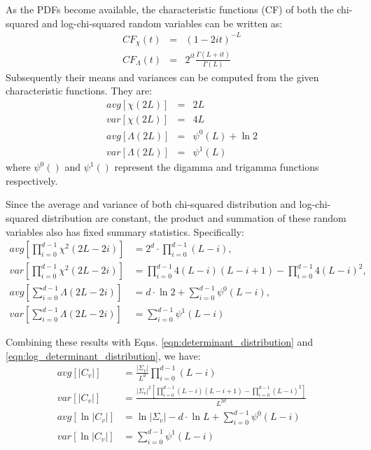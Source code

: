\documentclass[journal]{IEEEtran}
\begin{document}
As the PDFs become available, the characteristic functions (CF) of both the chi-squared and log-chi-squared random variables
  can be written as:
  \begin{eqnarray}
    CF_\chi(t) &=& (1-2it)^{−L} \\ 
    CF_\Lambda(t) &=& 2^{it} \frac{\Gamma(L+it)}{\Gamma(L)} \label{eqn:log_chi_squared_characteristic_function}
  \end{eqnarray}
Subsequently their means and variances can be computed from the given characteristic functions.
They are:
  \begin{eqnarray}
    avg \left[ \chi(2L) \right]&=&2L \\
var \left[ \chi(2L) \right]&=&4L \\
avg \left[ \Lambda(2L) \right] &=& \psi^0(L) + \ln2 \\
var \left[ \Lambda(2L) \right] &=& \psi^1(L)
  \end{eqnarray}
  where $\psi^0()$ and $\psi^1()$ represent the digamma and trigamma functions respectively.

Since the average and variance of both chi-squared distribution and log-chi-squared distribution are constant,
  the product and summation of these random variables also has fixed summary statistics.
Specifically:
\begin{align*}
  avg \left[ \prod^{d-1}_{i=0} \chi^2(2L-2i) \right] &= 2^d \cdot \prod^{d-1}_{i=0} (L-i), \\
  var \left[ \prod^{d-1}_{i=0} \chi^2(2L-2i) \right] &= \prod^{d-1}_{i=0} 4(L-i)(L-i+1) - \prod^{d-1}_{i=0} 4(L-i)^2, \\
  avg \left[ \sum^{d-1}_{i=0} \Lambda(2L-2i) \right] &= d \cdot \ln{2} + \sum^{d-1}_{i=0} \psi^0(L-i), \\
  var \left[ \sum^{d-1}_{i=0} \Lambda(2L-2i) \right] &= \sum^{d-1}_{i=0} \psi^1(L-i)
\end{align*}

Combining these results with Eqns. \ref{eqn:determinant_distribution} and \ref{eqn:log_determinant_distribution}, we have:
\begin{align}
  avg \left[ |C_v| \right]  &= \frac{|\Sigma_v|}{L^d} \prod^{d-1}_{i=0} (L-i)\\
  var \left[ |C_v| \right]  &=   \frac{|\Sigma_v|^2 \left[ \prod^{d-1}_{i=0} (L-i)(L-i+1) - \prod^{d-1}_{i=0} (L-i)^2 \right] }{L^{2d}} \label{eqn:var_det_is_heteroskedastic}\\
  avg \left[ \ln |C_v| \right] &= \ln |\Sigma_v| - d \cdot \ln{L}  + \sum^{d-1}_{i=0} \psi^0(L-i) \label{eqn:avg_log_det} \\
  var \left[ \ln |C_v| \right] &=  \sum^{d-1}_{i=0} \psi^1(L-i) \label{eqn:var_log_det_is_homoskedastic}
\end{align}
\end{document}
